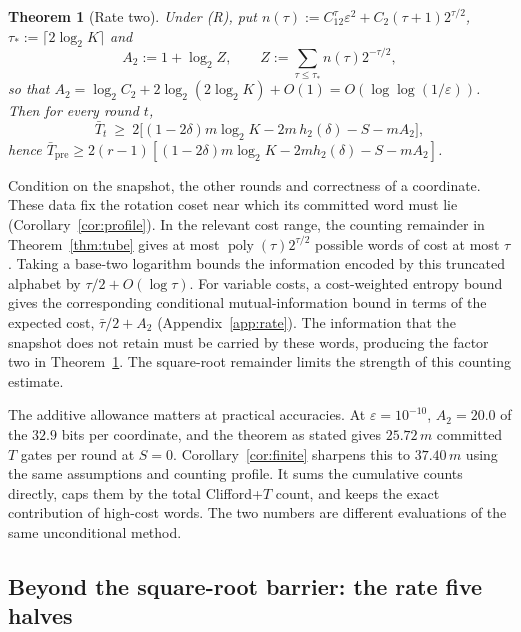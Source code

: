 \documentclass[aps,prx,twocolumn,superscriptaddress,nofootinbib,longbibliography]{revtex4-2}
\theoremstyle{plain}
\newtheorem{theorem}{Theorem}
\theoremstyle{definition}
\theoremstyle{remark}
\newcommand{\Tpre}{T_{\mathrm{pre}}}
\begin{document}
\begin{theorem}[Rate two]\label{thm:rate2}
Under (R), put $n(\tau):=C_12^\tau\varepsilon^2+C_2(\tau+1)2^{\tau/2}$, $\tau_*:=\lceil2\log_2K\rceil$ and
\begin{equation}\label{eq:A2}
A_2:=1+\log_2 Z,\qquad Z:=\sum_{\tau\le\tau_*}n(\tau)2^{-\tau/2},
\end{equation}
so that $A_2=\log_2C_2+2\log_2(2\log_2K)+O(1)=O(\log\log(1/\varepsilon))$. Then for every round $t$,
\begin{equation}
\bar T_t\ \ge\ 2\big[(1-2\delta)m\log_2K-2m\,h_2(\delta)-S-mA_2\big],
\end{equation}
hence $\bar\Tpre\ge2(r-1)[(1-2\delta)m\log_2K-2mh_2(\delta)-S-mA_2]$.
\end{theorem}
Condition on the snapshot, the other rounds and correctness of a coordinate. These data fix the rotation coset near which its committed word must lie (Corollary~\ref{cor:profile}). In the relevant cost range, the counting remainder in Theorem~\ref{thm:tube} gives at most $\operatorname{poly}(\tau)2^{\tau/2}$ possible words of cost at most $\tau$. Taking a base-two logarithm bounds the information encoded by this truncated alphabet by $\tau/2+O(\log\tau)$. For variable costs, a cost-weighted entropy bound gives the corresponding conditional mutual-information bound in terms of the expected cost, $\bar\tau/2+A_2$ (Appendix~\ref{app:rate}). The information that the snapshot does not retain must be carried by these words, producing the factor two in Theorem~\ref{thm:rate2}. The square-root remainder limits the strength of this counting estimate.

The additive allowance matters at practical accuracies. At $\varepsilon=10^{-10}$, $A_2=20.0$ of the $32.9$ bits per coordinate, and the theorem as stated gives $25.72\,m$ committed $T$ gates per round at $S=0$. Corollary~\ref{cor:finite} sharpens this to $37.40\,m$ using the same assumptions and counting profile. It sums the cumulative counts directly, caps them by the total Clifford+$T$ count, and keeps the exact contribution of high-cost words. The two numbers are different evaluations of the same unconditional method.

\subsection{Beyond the square-root barrier: the rate five halves}\label{sec:rate52}
\end{document}
